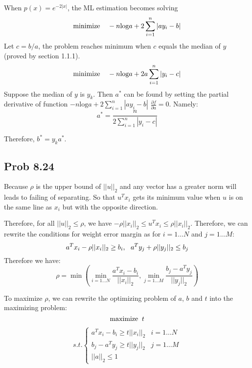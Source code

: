 \message{ !name(ass4_ChangLi.tex)}\documentclass[10pt,a4paper]{article}
\begin{document}
When $p(x)=e^{-2|x|}$, the ML estimation becomes solving
$$ \text{minimize\;\;\;\;}-n\text{log}a+2\sum_{i=1}^{n}|ay_i-b|$$
Let $c=b/a$, the problem reaches minimum when $c$ equals the
median of $y$ (proved by section 1.1.1). 
$$ \text{minimize\;\;\;\;}-n\text{log}a+2a\sum_{i=1}^{n}|y_i-c|$$
Suppose the median of $y$ is $y_k$. Then $a^*$ can be found
by setting the partial derivative of function
$-n\text{log}a+2\sum_{i=1}^{n}|ay_i-b|$ $\frac{\partial
  f}{\partial a}=0$. Namely: 
$$a^* = \frac{n}{2\sum_{i=1}^{n}|y_i-c|}$$

Therefore, $b^*=y_ka^*$.


\subsection{Prob 8.24}
Because $\rho$ is the upper bound of $||u||_2$ and any
vector has a greater norm will leads to failing of
separating. So that $u^Tx_i$ gets its minimum value when $u$
is on the same line as $x_i$ but with the opposite
direction.

Therefore, for all $||u||_2\leq \rho$, we have $-\rho ||x_i||_2 \leq
u^Tx_i\leq \rho ||x_i||_2$. Therefore, we can rewrite the
conditions for weight error margin as for $i=1\dots N$ and
$j=1\dots M$:
$$
a^Tx_i-\rho||x_i||_2\geq b_i \text{,\;\;\;}
a^Ty_j+\rho||y_j||_2\leq b_j
$$
Therefore we have:
$$\rho = \min(\min_{i=1\dots
  N}{\frac{a^Tx_i-b_i}{||x_i||_2}},\min_{j=1\dots M}{\frac{b_j-a^Ty_j}{||y_j||_2}})$$

To maximize $\rho$, we can rewrite the optimizing problem of $a$, $b$ and $t$ into the maximizing
problem:
$$\text{maximize\;\;}t$$
\begin{align*}
  s.t.
  \begin{cases}
    a^Tx_i-b_i\geq t||x_i||_2 & i=1\dots N\\
    b_j-a^Ty_j\geq t||y_j||_2 & j=1\dots M\\
    ||a||_2\leq 1
\end{cases}
\end{align*}




	\renewcommand\refname{Bibliography}
	
	
\end{document}
